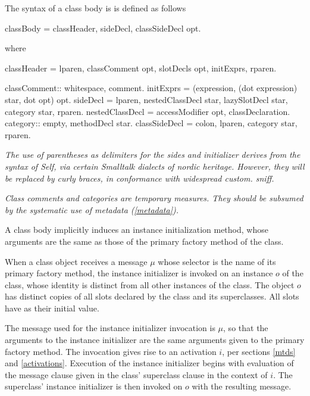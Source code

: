 \documentclass{article}
\begin{document}
The syntax of a class body is is defined as follows


\begin{newspeak}
classBody = classHeader, sideDecl, classSideDecl opt.
\end{newspeak}
where

\begin{newspeak}
classHeader =  lparen,  classComment opt, 
                        slotDecls opt, initExprs,  rparen.   

                                             
classComment:: whitespace, comment.     
initExprs = (expression, (dot expression) star, dot opt) opt.  
sideDecl = lparen, nestedClassDecl star, lazySlotDecl star, category star, rparen.
nestedClassDecl = accessModifier opt, classDeclaration.
category:: empty, methodDecl star.
classSideDecl = colon, lparen, category star, rparen.                               
\end{newspeak}
 
 {\it
 The use of parentheses as delimiters for the sides and initializer derives from the syntax of Self, via certain Smalltalk dialects of nordic heritage. However, they will be replaced by curly braces, in conformance with widespread custom. sniff.
 }
 
{\it
 Class comments and categories are temporary measures. They should be subsumed by the systematic use of metadata (\ref{metadata}).
 }
 
A class body implicitly induces an instance initialization method, whose arguments are the same as those of the primary factory method of the class.
 
When a class object receives a message $\mu$ whose selector is the name of its primary factory method, the instance initializer is invoked on an instance $o$ of the class, whose identity is distinct from all other instances of the class. The object $o$ has distinct copies of all slots declared by the class and its superclasses. All slots have \NIL{} as their initial value. 

The message used for the instance initializer invocation is $\mu$, so that the arguments to the instance initializer are the same arguments given to the primary factory method.  The invocation gives rise to an activation $i$, per sections \ref{mtds} and \ref{activations}.
Execution of the instance initializer begins with evaluation of the message clause given in the class' superclass clause in the context of $i$. The superclass' instance initializer is then invoked on $o$ with the resulting message.
\end{document}
